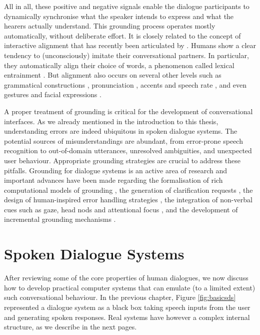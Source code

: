 All in all, these positive and negative signals enable the dialogue participants to dynamically synchronise what the speaker intends to express and what the hearers actually understand.   This grounding process operates mostly automatically, without deliberate effort.  It is closely related to the concept of interactive alignment that has recently been articulated by \cite{Garrod2004,Garrod2009}. Humans show a clear tendency to (unconsciously) imitate their conversational partners. In particular, they automatically align their choice of words, a phenomenon called lexical entrainment \citep{brennan1996conceptual}.  But alignment also occurs on several other levels such as grammatical constructions \citep{branigan2000syntactic}, pronunciation \citep{pardo2006phonetic}, accents and speech rate \citep{giles19911}, and even gestures and facial expressions \citep{bavelas1986show}.  

A proper treatment of grounding is critical for the development of conversational interfaces.  As we already mentioned in the introduction to this thesis, understanding errors are indeed ubiquitous in spoken dialogue systems.  The potential sources of misunderstandings are abundant, from error-prone speech recognition to out-of-domain utterances, unresolved ambiguities, and unexpected user behaviour.  Appropriate grounding strategies are crucial to address these pitfalls. Grounding for dialogue systems is an active area of research and important advances have been made regarding the formalisation of rich computational models of grounding \citep{Traum:1994thesis,MathesonPT00}, the generation of clarification requests \citep{Purver04Thesis,Rieser:2005}, the design of human-inspired error handling strategies \citep{Skantze2007}, the integration of non-verbal cues such as gaze, head nods and attentional focus \citep{Nakano:2003}, and the development of incremental grounding mechanisms \citep{visser_toward_2012}.

\section{Spoken Dialogue Systems}
\label{sec:sds}
After reviewing some of the core properties of human dialogues, we now discuss how to develop practical computer systems that can emulate (to a limited extent) such conversational behaviour.   In the previous chapter, Figure \ref{fig:basicsds} represented a dialogue system as a black box taking speech inputs from the user and generating spoken responses.   Real systems have however a complex internal structure, as we describe in the next pages.

